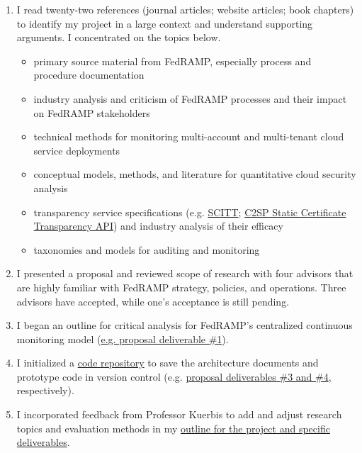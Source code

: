 \documentclass{jdf}
\begin{document}
\begin{enumerate}
    \item I read twenty-two references (journal articles; website articles; book chapters) to identify my project in a large context and understand supporting arguments. I concentrated on the topics below.
        \begin{itemize}
            \item primary source material from FedRAMP, especially process and procedure documentation
            \item industry analysis and criticism of FedRAMP processes and their impact on FedRAMP stakeholders
            \item technical methods for monitoring multi-account and multi-tenant cloud service deployments
            \item conceptual models, methods, and literature for quantitative cloud security analysis
            \item transparency service specifications (e.g. \hyperlink{https://datatracker.ietf.org/doc/draft-ietf-scitt-architecture/}{SCITT}; \hyperlink{https://c2sp.org/static-ct-api}{C2SP Static Certificate Transparency API}) and industry analysis of their efficacy
            \item taxonomies and models for auditing and monitoring
        \end{itemize}
    \item I presented a proposal and reviewed scope of research with four advisors that are highly familiar with FedRAMP strategy, policies, and operations. Three advisors have accepted, while one's acceptance is still pending.
    \item I began an outline for critical analysis for FedRAMP's centralized continuous monitoring model (\hyperlink{https://github.com/aj-stein/practicum_proposal/blob/main/paper.pdf}{e.g. proposal deliverable \#1}).
    \item I initialized a \hyperlink{https://github.com/aj-stein/conmotion.git}{code repository} to save the architecture documents and prototype code in version control (e.g. \hyperlink{https://github.com/aj-stein/practicum_proposal/blob/main/paper.pdf}{proposal deliverables \#3 and \#4}, respectively).
    \item I incorporated feedback from Professor Kuerbis to add and adjust research topics and evaluation methods in my \hyperlink{https://github.com/aj-stein/practicum/blob/main/notes.pdf}{outline for the project and specific deliverables}.
\end{enumerate}
\end{document}

